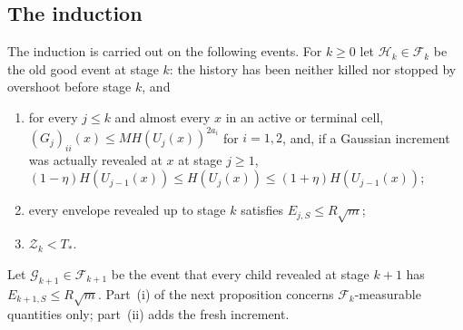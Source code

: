 \documentclass[11pt]{article}
\theoremstyle{definition}
\theoremstyle{remark}
\numberwithin{equation}{section}
\newcommand{\F}{\mathcal F}
\begin{document}
\subsection{The induction}
The induction is carried out on the following events. For $k\ge0$
let $\mathcal H_k\in\F_k$ be the old good event at
stage $k$: the history has been neither killed nor stopped by
overshoot before stage $k$, and
\begin{enumerate}[label=(H\arabic*),leftmargin=3em]
\item for every $j\le k$ and almost every $x$ in an active or terminal
  cell, $(G_j)_{ii}(x)\le M H(U_j(x))^{2a_i}$ for $i=1,2$, and, if a
  Gaussian increment was actually revealed at $x$ at stage $j\ge1$,
  $(1-\eta)H(U_{j-1}(x))\le H(U_j(x))\le(1+\eta)H(U_{j-1}(x))$;
\item every envelope revealed up to stage $k$ satisfies
  $E_{j,S}\le R\sqrt m$;
\item $\mathcal Z_k<T_*$.
\end{enumerate}
Let $\mathcal G_{k+1}\in\F_{k+1}$ be the event that every child
revealed at stage $k+1$ has $E_{k+1,S}\le R\sqrt m$.
Part~(i) of the next proposition concerns $\F_k$-measurable
quantities only; part~(ii) adds the fresh increment.
\end{document}
